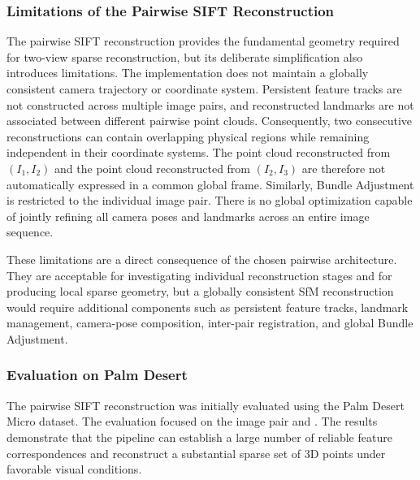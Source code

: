 \subsubsection{Limitations of the Pairwise SIFT Reconstruction}

The pairwise SIFT reconstruction provides the fundamental geometry required
for two-view sparse reconstruction, but its deliberate simplification also
introduces limitations.
The implementation does not maintain a globally consistent camera trajectory
or coordinate system. Persistent feature tracks are not constructed across
multiple image pairs, and reconstructed landmarks are not associated between
different pairwise point clouds.
Consequently, two consecutive reconstructions can contain overlapping
physical regions while remaining independent in their coordinate systems.
The point cloud reconstructed from $(I_1,I_2)$ and the point cloud reconstructed
from $(I_2,I_3)$ are therefore not automatically expressed in a common global
frame.
Similarly, Bundle Adjustment is restricted to the individual image pair.
There is no global optimization capable of jointly refining all camera poses
and landmarks across an entire image sequence.

These limitations are a direct consequence of the chosen pairwise
architecture. They are acceptable for investigating individual reconstruction
stages and for producing local sparse geometry, but a globally consistent SfM
reconstruction would require additional components such as persistent feature
tracks, landmark management, camera-pose composition, inter-pair
registration, and global Bundle Adjustment.

\subsubsection{Evaluation on Palm Desert}

The pairwise SIFT reconstruction was initially evaluated using the Palm Desert
Micro dataset. The evaluation focused on the image pair
 and . The results demonstrate that the
pipeline can establish a large number of reliable feature correspondences and
reconstruct a substantial sparse set of 3D points under favorable visual
conditions.


